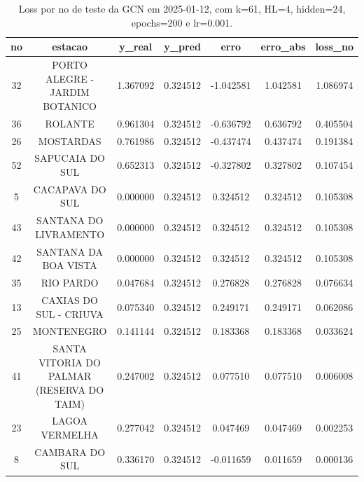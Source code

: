 \begin{table}[h]
\centering
\caption{Loss por no de teste da GCN em 2025-01-12, com k=61, HL=4, hidden=24, epochs=200 e lr=0.001.}
\label{tab:gcn_loss_k61_hl4_h24_e200_d20250112}
\begin{tabular}{ccccccc}
\toprule
no & estacao & y\_real & y\_pred & erro & erro\_abs & loss\_no \\
\midrule
32 & PORTO ALEGRE - JARDIM BOTANICO & 1.367092 & 0.324512 & -1.042581 & 1.042581 & 1.086974 \\
36 & ROLANTE & 0.961304 & 0.324512 & -0.636792 & 0.636792 & 0.405504 \\
26 & MOSTARDAS & 0.761986 & 0.324512 & -0.437474 & 0.437474 & 0.191384 \\
52 & SAPUCAIA DO SUL & 0.652313 & 0.324512 & -0.327802 & 0.327802 & 0.107454 \\
5 & CACAPAVA DO SUL & 0.000000 & 0.324512 & 0.324512 & 0.324512 & 0.105308 \\
43 & SANTANA DO LIVRAMENTO & 0.000000 & 0.324512 & 0.324512 & 0.324512 & 0.105308 \\
42 & SANTANA DA BOA VISTA & 0.000000 & 0.324512 & 0.324512 & 0.324512 & 0.105308 \\
35 & RIO PARDO & 0.047684 & 0.324512 & 0.276828 & 0.276828 & 0.076634 \\
13 & CAXIAS DO SUL - CRIUVA & 0.075340 & 0.324512 & 0.249171 & 0.249171 & 0.062086 \\
25 & MONTENEGRO & 0.141144 & 0.324512 & 0.183368 & 0.183368 & 0.033624 \\
41 & SANTA VITORIA DO PALMAR (RESERVA DO TAIM) & 0.247002 & 0.324512 & 0.077510 & 0.077510 & 0.006008 \\
23 & LAGOA VERMELHA & 0.277042 & 0.324512 & 0.047469 & 0.047469 & 0.002253 \\
8 & CAMBARA DO SUL & 0.336170 & 0.324512 & -0.011659 & 0.011659 & 0.000136 \\
\bottomrule
\end{tabular}
\end{table}
